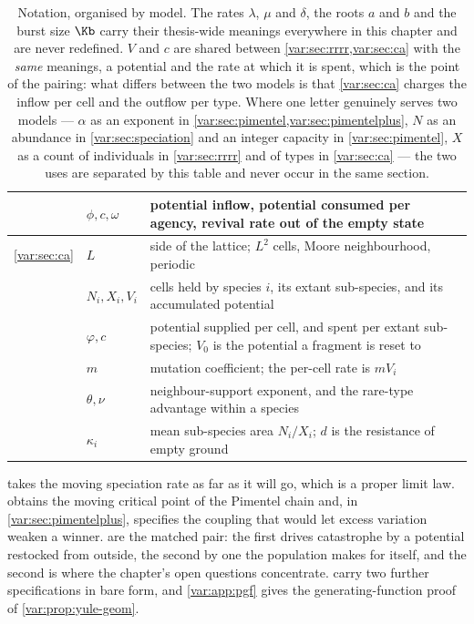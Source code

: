 \begin{table}[H]
\begin{tabular}{@{}ll>{\raggedright\arraybackslash}p{}@{}}
 & $\phi,c,\omega$ & potential inflow, potential consumed per agency, revival rate out of the empty state \\
\midrule
\ref{var:sec:ca}
 & $L$ & side of the lattice; $L^2$ cells, Moore neighbourhood, periodic \\
 & $N_i,X_i,V_i$ & cells held by species $i$, its extant sub-species, and
   its accumulated potential \\
 & $\varphi,c$ & potential supplied per cell, and spent per extant
   sub-species; $V_0$ is the potential a fragment is reset to \\
 & $m$ & mutation coefficient; the per-cell rate is $mV_i$ \\
 & $\theta,\nu$ & neighbour-support exponent, and the rare-type advantage
   within a species \\
 & $\kappa_i$ & mean sub-species area $N_i/X_i$; $d$ is the resistance of
   empty ground \\
\bottomrule
\end{tabular}
\caption{Notation, organised by model. The rates $\lambda$, $\mu$ and
$\delta$, the roots $a$ and $b$ and the burst size $\Kb$ carry their
thesis-wide meanings everywhere in this chapter and are never redefined.
$V$ and $c$ are shared between \cref{var:sec:rrrr,var:sec:ca} with the
\emph{same} meanings, a potential and the rate at which it is spent, which is
the point of the pairing: what differs between the two models is that
\cref{var:sec:ca} charges the inflow per cell and the outflow per type. Where
one letter genuinely serves two models --- $\alpha$ as an exponent in
\cref{var:sec:pimentel,var:sec:pimentelplus}, $N$ as an abundance in
\cref{var:sec:speciation} and an integer capacity in
\cref{var:sec:pimentel}, $X$ as a count of individuals in
\cref{var:sec:rrrr} and of types in \cref{var:sec:ca} --- the two uses are
separated by this table and never occur in the same section.}
\label{var:tab:notation}
\end{table}

 takes the moving speciation rate as far as it will
go, which is a proper limit law.  obtains the moving
critical point of the Pimentel chain and, in
\cref{var:sec:pimentelplus}, specifies the coupling that would let excess
variation weaken a winner.  are the matched
pair: the first drives catastrophe by a potential restocked from outside, the
second by one the population makes for itself, and the second is where the
chapter's open questions concentrate. 
carry two further specifications in bare form, and \cref{var:app:pgf} gives
the generating-function proof of \cref{var:prop:yule-geom}.

\FloatBarrier
